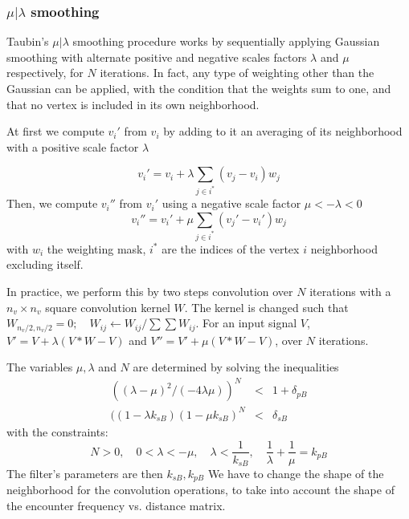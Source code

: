 \documentclass[12pt]{article}
\begin{document}
\subsubsection{$\mu|\lambda$ smoothing}\label{subsubsection_muLambdaSmoothing} 

Taubin's $\mu|\lambda$ smoothing procedure \cite{taubin1995curve}works by sequentially applying Gaussian smoothing with alternate positive and negative scales factors $\lambda$ and $\mu$ respectively, for $N$ iterations. In fact, any type of weighting other than the Gaussian can be applied, with the condition that the weights sum to one, and that no vertex is included in its own neighborhood. 

At first we compute $v_i'$ from $v_i$ by adding to it an averaging of its neighborhood with a positive scale factor $\lambda$ 

\begin{equation*}
v_i' = v_i+\lambda\sum_{j\in i^*} (v_j-v_i)w_j
\end{equation*}
Then, we compute $v_i''$ from $v_i'$ using a negative scale factor $\mu<-\lambda<0$
\begin{equation*}
v_i'' = v_i'+\mu\sum_{j\in i^*} (v_j'-v_i')w_j
\end{equation*}
with $w_i$ the weighting mask, $i^*$ are the indices of the vertex $i$ neighborhood excluding itself. 

In practice, we perform this by two steps convolution over $N$ iterations with a $n_v\times n_v$ square convolution kernel $W$. The kernel is changed such that $W_{n_v/2,n_v/2} =0; \quad W_{ij}\leftarrow W_{ij}/\sum\sum W_{ij}$. For an input signal $V$, $V' = V+\lambda (V*W-V)$
and $V''= V'+\mu (V*W-V)$, over $N$ iterations. 

The variables $\mu,\lambda$ and $N$ are determined by solving the inequalities 
\begin{eqnarray*}
((\lambda-\mu)^2 /(-4\lambda\mu))^N &<& 1+\delta_{pB}\\
((1-\lambda k_{sB})(1-\mu k_{sB})^N &<& \delta_{sB}
\end{eqnarray*}
with the constraints:
\begin{equation*}
N>0,\quad 0<\lambda<-\mu,\quad \lambda<\frac{1}{k_{sB}},\quad \frac{1}{\lambda}+\frac{1}{\mu}=k_{pB}
\end{equation*} 
The filter's parameters are then $k_{sB}, k_{pB}$
We have to change the shape of the neighborhood for the convolution operations, to take into account the shape of the encounter frequency vs. distance matrix. 
\end{document}

